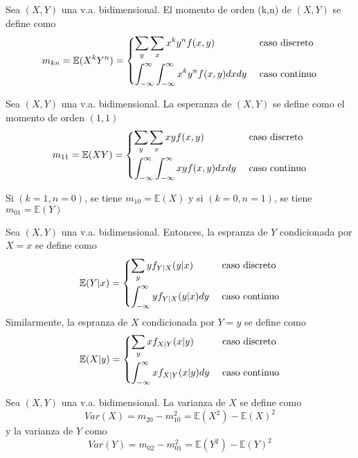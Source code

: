 \begin{defn}
Sea $(X,Y)$ una v.a. bidimensional. El momento de orden (k,n) de $(X,Y)$ se define como 
\[ m_{kn} = \mathbb{E}(X^kY^n) = 
\begin{dcases} 
    \sum_y \sum_x x^ky^nf(x,y) & \text{ caso discreto}\\
    \int_{-\infty}^\infty \int_{-\infty}^\infty x^ky^nf(x,y)dx dy & \text{ caso continuo}
\end{dcases}\]
\end{defn}

\begin{defn}[Esperanza]
Sea $(X,Y)$ una v.a. bidimensional. La esperanza de $(X,Y)$ se define como el momento de orden $(1,1)$ \[ m_{11} = \mathbb{E}(XY) = 
\begin{dcases} 
    \sum_y \sum_x xyf(x,y) & \text{ caso discreto}\\
    \int_{-\infty}^\infty \int_{-\infty}^\infty xyf(x,y)dx dy & \text{ caso continuo}
\end{dcases}\]
\end{defn}
\begin{obs}
Si $(k=1,n=0)$, se tiene $m_{10} = \mathbb{E}(X)$ y si $(k=0,n=1)$, se tiene $m_{01} = \mathbb{E}(Y)$
\end{obs}

\begin{defn}
Sea $(X,Y)$ una v.a. bidimensional. Entonces, la espranza de $Y$ condicionada por $X = x$ se define como \[ \mathbb{E}(Y|x) =
\begin{dcases} 
    \sum_y yf_{Y|X}(y|x) & \text{ caso discreto}\\
    \int_{-\infty}^\infty yf_{Y|X}(y|x) dy & \text{ caso continuo}
\end{dcases}\]
Similarmente, la espranza de $X$ condicionada por $Y = y$ se define como \[ \mathbb{E}(X|y) =
\begin{dcases} 
    \sum_y xf_{X|Y}(x|y) & \text{ caso discreto}\\
    \int_{-\infty}^\infty xf_{X|Y}(x|y) dy & \text{ caso continuo}
\end{dcases}\]
\end{defn}

\begin{defn}[Varianza]
Sea $(X,Y)$ una v.a. bidimensional. La varianza de $X$ se define como \[ Var(X) = m_{20} - m_{10}^2 = \mathbb{E}(X^2) - \mathbb{E}(X)^2\] y la varianza de $Y$ como \[ Var(Y) = m_{02} - m_{01}^2 = \mathbb{E}(Y^2) - \mathbb{E}(Y)^2\]
\end{defn}

